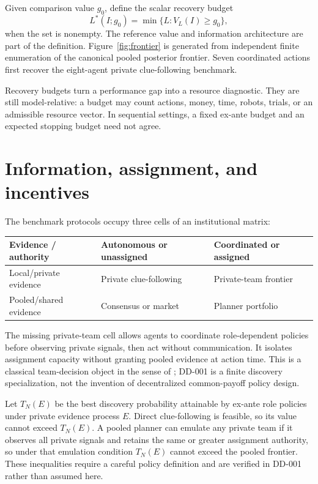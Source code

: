 \documentclass[11pt]{article}
\theoremstyle{remark}
\begin{document}
Given comparison value $g_0$, define the scalar recovery budget
\[
L^*(I;g_0)=\min\{L:V_L(I)\ge g_0\},
\]
when the set is nonempty. The reference value and information architecture are part of the definition. Figure~\ref{fig:frontier} is generated from independent finite enumeration of the canonical pooled posterior frontier. Seven coordinated actions first recover the eight-agent private clue-following benchmark.



Recovery budgets turn a performance gap into a resource diagnostic. They are still model-relative: a budget may count actions, money, time, robots, trials, or an admissible resource vector. In sequential settings, a fixed ex-ante budget and an expected stopping budget need not agree.

\section{Information, assignment, and incentives}
\label{sec:institutions}
The benchmark protocols occupy three cells of an institutional matrix:
\begin{center}
\begin{tabular}{lll}
\toprule
Evidence / authority & Autonomous or unassigned & Coordinated or assigned\\
\midrule
Local/private evidence & Private clue-following & Private-team frontier\\
Pooled/shared evidence & Consensus or market & Planner portfolio\\
\bottomrule
\end{tabular}
\end{center}
The missing private-team cell allows agents to coordinate role-dependent policies before observing private signals, then act without communication. It isolates assignment capacity without granting pooled evidence at action time. This is a classical team-decision object in the sense of \citet{MarschakRadner1972}; DD-001 is a finite discovery specialization, not the invention of decentralized common-payoff policy design.

Let $T_N(E)$ be the best discovery probability attainable by ex-ante role policies under private evidence process $E$. Direct clue-following is feasible, so its value cannot exceed $T_N(E)$. A pooled planner can emulate any private team if it observes all private signals and retains the same or greater assignment authority, so under that emulation condition $T_N(E)$ cannot exceed the pooled frontier. These inequalities require a careful policy definition and are verified in DD-001 rather than assumed here.
\end{document}
